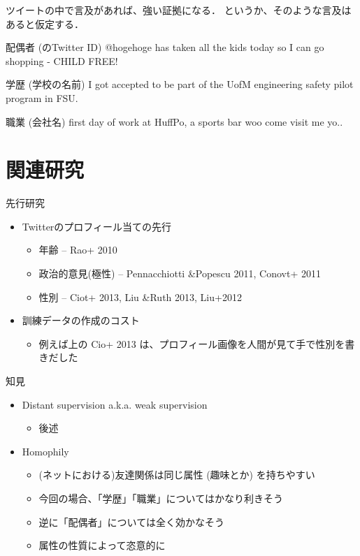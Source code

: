 \documentclass[12pt, dvipdfmx, default, cjk]{beamer}
\begin{document}
\begin{frame}
  ツイートの中で言及があれば、強い証拠になる．
  というか、そのような言及はあると仮定する．
  \begin{alertblock}{配偶者 (のTwitter ID)}
    @\alert {hogehoge} has taken all the kids today so I can go shopping - CHILD FREE!
  \end{alertblock}
  \begin{alertblock}{学歴 (学校の名前)}
    I got accepted to be part of the UofM engineering safety pilot program in \alert{FSU}.
  \end{alertblock}
  \begin{alertblock}{職業 (会社名)}
    first day of work at \alert{HuffPo}, a sports bar woo come visit me yo..
  \end{alertblock}
\end{frame}

\section{関連研究}

\begin{frame}{先行研究}
  \begin{itemize}
    \item Twitterのプロフィール当ての先行
      \begin{itemize}
        \item 年齢 -- Rao+ 2010
        \item 政治的意見(極性) -- Pennacchiotti \&Popescu 2011, Conovt+ 2011
        \item 性別 -- Ciot+ 2013, Liu \&Ruth 2013, Liu+2012
      \end{itemize}
    \item 訓練データの作成のコスト
      \begin{itemize}
        \item 例えば上の Cio+ 2013 は、プロフィール画像を人間が見て手で性別を書きだした
      \end{itemize}
  \end{itemize}
\end{frame}

\begin{frame}{知見}
  \begin{itemize}
    \item Distant supervision a.k.a. weak supervision
      \begin{itemize}
        \item 後述
      \end{itemize}
    \item Homophily
      \begin{itemize}
        \item (ネットにおける)友達関係は同じ属性 (趣味とか) を持ちやすい
        \item 今回の場合、「学歴」「職業」についてはかなり利きそう
        \item 逆に「配偶者」については全く効かなそう
        \item 属性の性質によって恣意的に
      \end{itemize}
  \end{itemize}
\end{frame}
\end{document}
